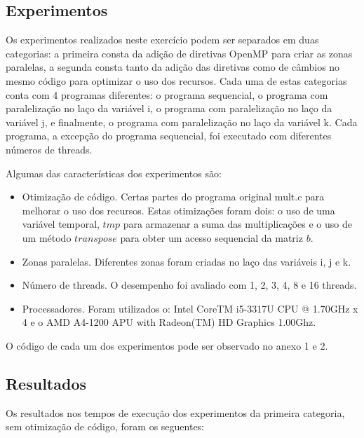 \documentclass[a4paper,12pt,fleqn]{article}
\begin{document}
\subsection{Experimentos} 
Os experimentos realizados neste exercício podem ser separados em duas categorias: a primeira consta da adição de diretivas OpenMP para criar as zonas paralelas, a segunda consta tanto da adição das  diretivas como de câmbios no mesmo código para optimizar o uso dos recursos. Cada uma de estas categorias conta com 4 programas diferentes: o programa sequencial, o programa com paralelização no laço da variável i, o programa com paralelização no laço da variável j, e finalmente, o programa com paralelização no laço da variável k. Cada programa, a excepção do programa sequencial, foi executado com diferentes números de threads.  
 
Algumas das características dos experimentos são: 
\begin{itemize} 
\item Otimização de código. Certas partes do programa original mult.c para melhorar o uso dos recursos. Estas otimizações foram dois: o uso de uma variável temporal, $tmp$ para armazenar a suma das multiplicações e o uso de um método $transpose$ para obter um acesso sequencial da matriz $b$. 
\item Zonas paralelas. Diferentes zonas foram criadas no laço das variáveis i, j e k.  
\item Número de threads. O desempenho foi avaliado com 1, 2, 3, 4, 8 e 16 threads.   
\item Processadores. Foram utilizados o: Intel CoreTM i5-3317U CPU @ 1.70GHz x 4 e o AMD A4-1200 APU with Radeon(TM) HD Graphics 1.00Ghz.
\end{itemize} 
O código de cada um dos experimentos pode ser observado no anexo 1 e 2.  
\subsection{Resultados} 
Os resultados nos tempos de execução dos experimentos da primeira categoria, sem otimização de código, foram os seguentes: 
\end{document}

